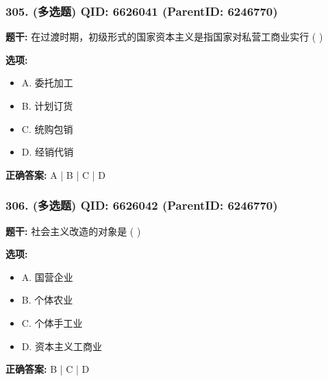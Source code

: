\documentclass[12pt,UTF8]{ctexart}
\begin{document}
\vspace{0.3em}\hrulefill\vspace{0.7em}

\subsubsection*{305. (多选题) \small QID: 6626041 (ParentID: 6246770)}

\textbf{题干:}
在过渡时期，初级形式的国家资本主义是指国家对私营工商业实行  ( )



\textbf{选项:}
\begin{itemize}[leftmargin=*]

  \item A. 委托加工

  \item B. 计划订货

  \item C. 统购包销

  \item D. 经销代销

\end{itemize}

\textbf{正确答案:}
A | B | C | D

\vspace{0.3em}\hrulefill\vspace{0.7em}

\subsubsection*{306. (多选题) \small QID: 6626042 (ParentID: 6246770)}

\textbf{题干:}
社会主义改造的对象是  ( )



\textbf{选项:}
\begin{itemize}[leftmargin=*]

  \item A. 国营企业

  \item B. 个体农业

  \item C. 个体手工业

  \item D. 资本主义工商业

\end{itemize}

\textbf{正确答案:}
B | C | D

\vspace{0.3em}\hrulefill\vspace{0.7em}
\end{document}
